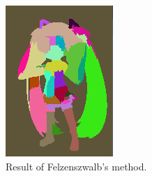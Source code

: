 \begin{figure}[htb!]
\begin{subfigure}{0.3\textwidth}
\includegraphics[width=\textwidth]{images/miku_seg_initial.png}
\caption{Result of Felzenszwalb's method.}
\end{subfigure}
\begin{subfigure}{0.3\textwidth}

\end{subfigure}
\end{figure}
